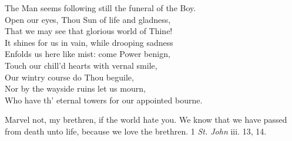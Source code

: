  The Man seems following still the funeral of the Boy. \\
  Open our eyes, Thou Sun of life and gladness, \\
 That we may see that glorious world of Thine! \\
 It shines for us in vain, while drooping sadness \\
 Enfolds us here like mist: come Power benign, \\
 Touch our chill’d hearts with vernal smile, \\
 Our wintry course do Thou beguile, \\
 Nor by the wayside ruins let us mourn, \\
 Who have th’ eternal towers for our appointed bourne.\\


Marvel not, my brethren, if the world hate you. We know that we have passed from death unto life, because we love the brethren. 1 \emph{St. John} iii. 13, 14.

